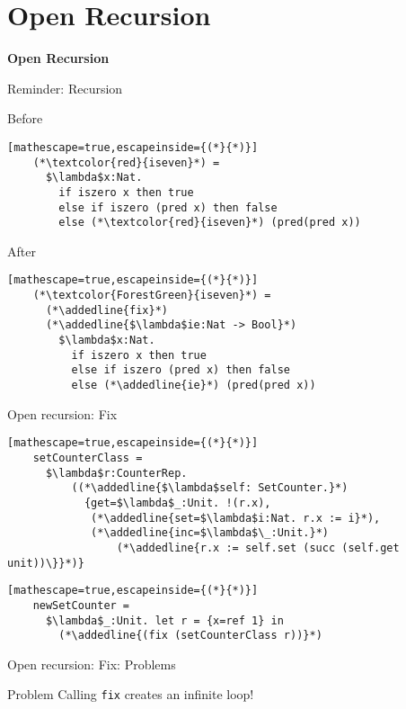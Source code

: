 \documentclass[presentation,xcolor=svgnames]{beamer}
\newcommand{\sectionframe}[1]{
  \begin{frame}
    \centering
    \huge \textbf{#1}
  \end{frame}
}
\begin{document}
\section{Open Recursion}



\sectionframe{Open Recursion}

\begin{frame}[fragile]{Reminder: Recursion}
  \begin{block}{Before}
  \begin{lstlisting}[mathescape=true,escapeinside={(*}{*)}]
    (*\textcolor{red}{iseven}*) =
      $\lambda$x:Nat.
        if iszero x then true
        else if iszero (pred x) then false
        else (*\textcolor{red}{iseven}*) (pred(pred x))
  \end{lstlisting}
  \end{block}

  \begin{block}{After}
  \begin{lstlisting}[mathescape=true,escapeinside={(*}{*)}]
    (*\textcolor{ForestGreen}{iseven}*) =
      (*\addedline{fix}*)
      (*\addedline{$\lambda$ie:Nat -> Bool}*)
        $\lambda$x:Nat.
          if iszero x then true
          else if iszero (pred x) then false
          else (*\addedline{ie}*) (pred(pred x))
  \end{lstlisting}
  \end{block}
\end{frame}

\begin{frame}[fragile]{Open recursion: Fix}
  \begin{lstlisting}[mathescape=true,escapeinside={(*}{*)}]
    setCounterClass =
      $\lambda$r:CounterRep.
          ((*\addedline{$\lambda$self: SetCounter.}*)
            {get=$\lambda$_:Unit. !(r.x),
             (*\addedline{set=$\lambda$i:Nat. r.x := i}*),
             (*\addedline{inc=$\lambda$\_:Unit.}*)
                 (*\addedline{r.x := self.set (succ (self.get unit))\}}*)}
  \end{lstlisting}
  \begin{lstlisting}[mathescape=true,escapeinside={(*}{*)}]
    newSetCounter =
      $\lambda$_:Unit. let r = {x=ref 1} in
        (*\addedline{(fix (setCounterClass r))}*)
  \end{lstlisting}
\end{frame}

\begin{frame}[fragile]{Open recursion: Fix: Problems}
  \begin{block}{Problem}
    Calling \texttt{fix} creates an infinite loop!
  \end{block}
\end{frame}
\end{document}
